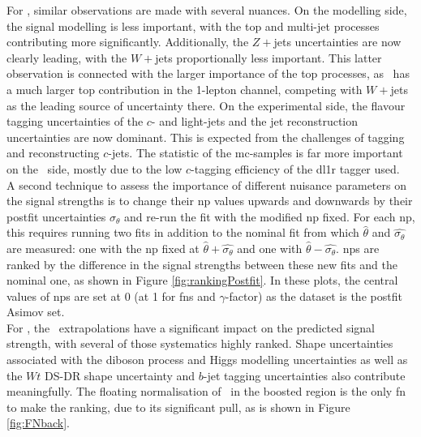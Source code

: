 For \vhc, similar observations are made with several nuances. On the modelling side, the signal modelling is less important, with the top and multi-jet processes contributing more significantly. Additionally, the $Z+$jets uncertainties are now clearly leading, with the $W+$jets proportionally less important. This latter observation is connected with the larger importance of the top processes, as \vhc\ has a much larger top contribution in the 1-lepton channel, competing with $W+$jets as the leading source of uncertainty there. On the experimental side, the flavour tagging uncertainties of the $c$- and light-jets and the jet reconstruction uncertainties are now dominant. This is expected from the challenges of tagging and reconstructing $c$-jets. The statistic of the \gls{mc}-samples is far more important on the \vhc\ side, mostly due to the low $c$-tagging efficiency of the \gls{dl1r} tagger used. \\

A second technique to assess the importance of different nuisance parameters on the signal strengths is to change their \gls{np} values upwards and downwards by their postfit uncertainties $\sigma_{\theta}$ and re-run the fit with the modified \gls{np} fixed. For each \gls{np}, this requires running two fits in addition to the nominal fit from which $\hat{\theta}$ and $\hat{\sigma_{\theta}}$ are measured: one with the \gls{np} fixed at $\hat{\theta} + \hat{\sigma_{\theta}}$ and one with $\hat{\theta} - \hat{\sigma_{\theta}}$. \glspl{np} are ranked by the difference in the signal strengths between these new fits and the nominal one, as shown in Figure \ref{fig:rankingPostfit}. In these plots, the central values of \glspl{np} are set at 0 (at 1 for \glspl{fn} and $\gamma$-factor) as the dataset is the postfit Asimov set. \\

For \vhb, the \whf\ extrapolations have a significant impact on the predicted signal strength, with several of those systematics highly ranked. Shape uncertainties associated with the diboson process and Higgs modelling uncertainties as well as the $Wt$ DS-DR shape uncertainty and $b$-jet tagging uncertainties also contribute meaningfully. The floating normalisation of \whf\ in the boosted region is the only \gls{fn} to make the ranking, due to its significant pull, as is shown in Figure \ref{fig:FNback}. \\

